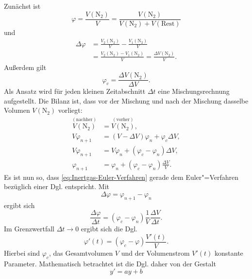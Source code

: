\documentclass[a4paper,10pt,fleqn,twocolumn,twoside,dvipdfmx]{scrartcl}
\numberwithin{equation}{section}
\begin{document}
Zunächst ist
\begin{equation}
\varphi = \frac{V(\mathrm{N_2})}{V}
= \frac{V(\mathrm{N_2})}{V(\mathrm{N_2})+V(\mathrm{Rest})}
\end{equation}
und
\begin{equation}
\begin{split}
\Delta\varphi &= \frac{V_2(\mathrm{N_2})}{V}-\frac{V_1(\mathrm{N_2})}{V}\\
&= \frac{V_2(\mathrm{N_2})-V_1(\mathrm{N_2})}{V} = \frac{\Delta V(\mathrm{N_2})}{V}.
\end{split}
\end{equation}
Außerdem gilt
\begin{equation}
\varphi_c = \frac{\Delta V(\mathrm{N_2})}{\Delta V}.
\end{equation}
Als Ansatz wird für jeden kleinen Zeitabschnitt $\Delta t$ eine
Mischungsrechnung aufgestellt. Die Bilanz ist, dass vor der
Mischung und nach der Mischung dasselbe Volumen $V(\mathrm{N_2})$
vorliegt:%
\begin{align}
\overset{(\mathrm{nachher})}{V(\mathrm{N_2})} &= \overset{(\mathrm{vorher})}{V(\mathrm{N_2})},\\
\label{eq:Intertgas-Differenzengleichung}
V\varphi_{n+1} &= (V-\Delta V)\varphi_n +\varphi_c\Delta V,\\
V\varphi_{n+1} &= V\varphi_n+(\varphi_c-\varphi_n)\Delta V,\\
\label{eq:Inertgas-Euler-Verfahren}
\varphi_{n+1} &= \varphi_n+(\varphi_c-\varphi_n)\frac{\Delta V}{V}.
\end{align}
Es ist nun so, dass \eqref{eq:Inertgas-Euler-Verfahren} gerade
dem Euler"=Verfahren bezüglich einer Dgl. entspricht. Mit%
\begin{equation}
\Delta\varphi = \varphi_{n+1}-\varphi_{n}
\end{equation}
ergibt sich
\begin{equation}
\frac{\Delta\varphi}{\Delta t} = (\varphi_c-\varphi_n)\frac{1}{V}\frac{\Delta V}{\Delta t}.
\end{equation}
Im Grenzwertfall $\Delta t\to 0$ ergibt sich die Dgl.
\begin{equation}
\varphi'(t) = (\varphi_c-\varphi)\frac{V'(t)}{V}.
\end{equation}
Hierbei sind $\varphi_c$, das Gesamtvolumen $V$ und der
Volumenstrom $V'(t)$ konstante Parameter.
Mathematisch betrachtet ist die Dgl. daher von der Gestalt%
\begin{equation}
y' = ay+b
\end{equation}
\end{document}
